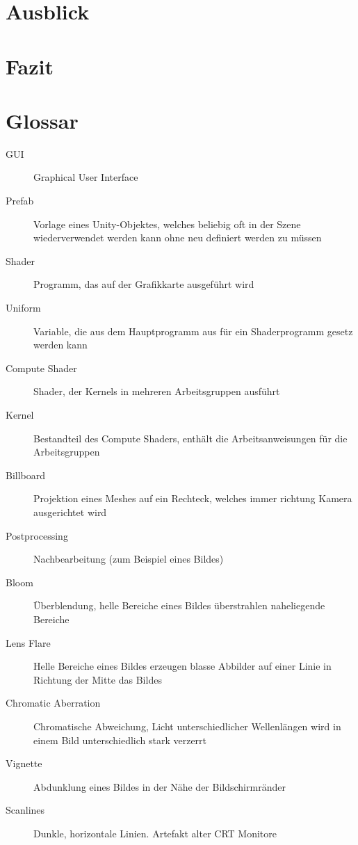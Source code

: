 \documentclass[a4paper,ngerman,12pt]{report}
\begin{document}
\chapter{Ausblick}

\lipsum[3]





\chapter{Fazit}

\lipsum[3]





\chapter{Glossar}

\begin{description}
\item[GUI] Graphical User Interface
\item[Prefab] Vorlage eines Unity-Objektes, welches beliebig oft in der Szene wiederverwendet werden kann ohne neu definiert werden zu müssen
\vspace{5mm}
\item[Shader] Programm, das auf der Grafikkarte ausgeführt wird
\item[Uniform] Variable, die aus dem Hauptprogramm aus für ein Shaderprogramm gesetz werden kann
\item[Compute Shader] Shader, der Kernels in mehreren Arbeitsgruppen ausführt
\item[Kernel] Bestandteil des Compute Shaders, enthält die Arbeitsanweisungen für die Arbeitsgruppen
\item[Billboard] Projektion eines Meshes auf ein Rechteck, welches immer richtung Kamera ausgerichtet wird
\vspace{5mm}
\item[Postprocessing] Nachbearbeitung (zum Beispiel eines Bildes)
\item[Bloom] Überblendung, helle Bereiche eines Bildes überstrahlen naheliegende Bereiche
\item[Lens Flare] Helle Bereiche eines Bildes erzeugen blasse Abbilder auf einer Linie in Richtung der Mitte das Bildes
\item[Chromatic Aberration] Chromatische Abweichung, Licht unterschiedlicher Wellenlängen wird in einem Bild unterschiedlich stark verzerrt
\item[Vignette] Abdunklung eines Bildes in der Nähe der Bildschirmränder
\item[Scanlines] Dunkle, horizontale Linien. Artefakt alter CRT Monitore
\end{description}
\end{document}
